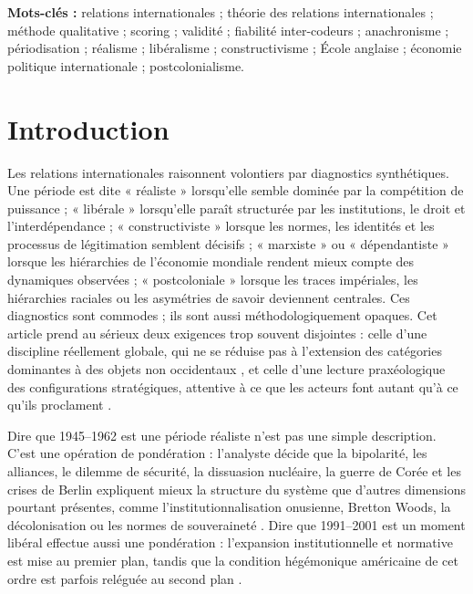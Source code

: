 \documentclass[11pt,a4paper]{article}
\begin{document}
\textbf{Mots-clés :} relations internationales ; théorie des relations internationales ; méthode qualitative ; scoring ; validité ; fiabilité inter-codeurs ; anachronisme ; périodisation ; réalisme ; libéralisme ; constructivisme ; École anglaise ; économie politique internationale ; postcolonialisme.

\section{Introduction}

Les relations internationales raisonnent volontiers par diagnostics synthétiques. Une période est dite « réaliste » lorsqu'elle semble dominée par la compétition de puissance ; « libérale » lorsqu'elle paraît structurée par les institutions, le droit et l'interdépendance ; « constructiviste » lorsque les normes, les identités et les processus de légitimation semblent décisifs ; « marxiste » ou « dépendantiste » lorsque les hiérarchies de l'économie mondiale rendent mieux compte des dynamiques observées ; « postcoloniale » lorsque les traces impériales, les hiérarchies raciales ou les asymétries de savoir deviennent centrales. Ces diagnostics sont commodes ; ils sont aussi méthodologiquement opaques. Cet article prend au sérieux deux exigences trop souvent disjointes : celle d'une discipline réellement globale, qui ne se réduise pas à l'extension des catégories dominantes à des objets non occidentaux \citep{acharya2014global,badie1992etat}, et celle d'une lecture praxéologique des configurations stratégiques, attentive à ce que les acteurs font autant qu'à ce qu'ils proclament \citep{aron1962paix}.

Dire que 1945--1962 est une période réaliste n'est pas une simple description. C'est une opération de pondération : l'analyste décide que la bipolarité, les alliances, le dilemme de sécurité, la dissuasion nucléaire, la guerre de Corée et les crises de Berlin expliquent mieux la structure du système que d'autres dimensions pourtant présentes, comme l'institutionnalisation onusienne, Bretton Woods, la décolonisation ou les normes de souveraineté \citep{morgenthau1948politics,waltz1979theory,gaddis2005cold,westad2005global}. Dire que 1991--2001 est un moment libéral effectue aussi une pondération : l'expansion institutionnelle et normative est mise au premier plan, tandis que la condition hégémonique américaine de cet ordre est parfois reléguée au second plan \citep{krauthammer1990unipolar,ikenberry2001after,ikenberry2011liberal,cox1981social}.
\end{document}
